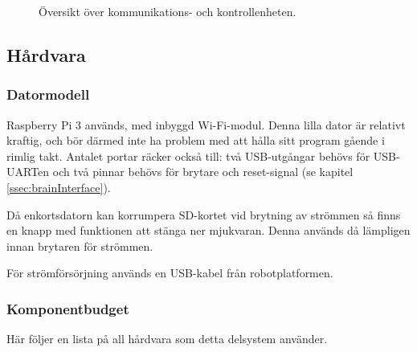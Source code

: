 \documentclass[a4paper,11pt]{article}
\begin{document}
\begin{figure}[h!]
    \caption{Översikt över kommunikations- och kontrollenheten.  }
    \label{fig:unitBrain}
\end{figure}

\subsection{Hårdvara}

\subsubsection{Datormodell}
Raspberry Pi 3 används, med inbyggd Wi-Fi-modul. Denna lilla dator är relativt kraftig, och bör därmed inte ha problem med att hålla sitt program gående i rimlig takt. Antalet portar räcker också till: två USB-utgångar behövs för USB-UARTen och två pinnar behövs för brytare och reset-signal (se kapitel \ref{ssec:brainInterface}).

Då enkortsdatorn kan korrumpera SD-kortet vid brytning av strömmen så finns en knapp med funktionen att stänga ner mjukvaran. Denna används då lämpligen innan brytaren för strömmen.

För strömförsörjning används en USB-kabel från robotplatformen.

\subsubsection{Komponentbudget}
Här följer en lista på all hårdvara som detta delsystem använder.

\begin{HardwareList}
\end{HardwareList}
\end{document}
